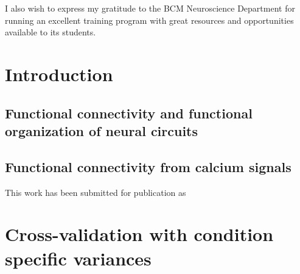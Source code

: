 \documentclass[12pt,twoside,openright]{report}
\begin{document}
I also wish to express my gratitude to the BCM Neuroscience Department for running an excellent training program with great resources and opportunities available to its students.



\begin{abstract}

\end{abstract}

\tableofcontents

\listoffigures


\chapter{Introduction}

\section{Functional connectivity and functional organization of neural circuits}

\section{Functional connectivity from calcium signals}
This work has been submitted for publication as \citep{Yatsenko:2014}

\appendix

\chapter{Cross-validation with condition specific variances}


\end{document}
